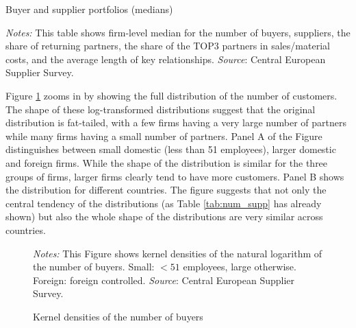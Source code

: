 \documentclass[final, dvipsnames, authoryear,12pt]{elsarticle}
\begin{document}

\begin{table}[H]
    \caption{Buyer and supplier portfolios (medians)}
    \label{tab:num_supp}
    \centerline{
    }
    {\scriptsize \textit{Notes:} This table shows firm-level median for the number of buyers, suppliers, the share of returning partners, the share of the TOP3 partners in sales/material costs, and the average length of key relationships. \textit{Source}: Central European Supplier Survey.}
\end{table}


Figure \ref{fig:kernel} zooms in by showing the full distribution of the number of customers. The shape of these log-transformed distributions suggest that the original distribution is fat-tailed, with a few firms having a very large number of partners while many firms having a small number of partners. Panel A of the Figure distinguishes between small domestic (less than 51 employees), larger domestic and foreign firms. While the shape of the distribution is similar for the three groups of firms, larger firms clearly tend to have more customers. Panel B shows the distribution for different countries. The figure suggests that not only the central tendency of the distributions (as Table \ref{tab:num_supp} has already shown) but also the whole shape of the distributions are very similar across countries.


\begin{figure}[h]    
    \begin{center}
    \caption{Kernel densities of the number of buyers}
    \label{fig:kernel}       
    \end{center}
    {\footnotesize \textit{Notes:} This Figure shows kernel densities of the natural logarithm of the number of buyers. Small: $< 51$ employees, large otherwise. Foreign: foreign controlled. \textit{Source}: Central European Supplier Survey.}
\end{figure}
\end{document}
